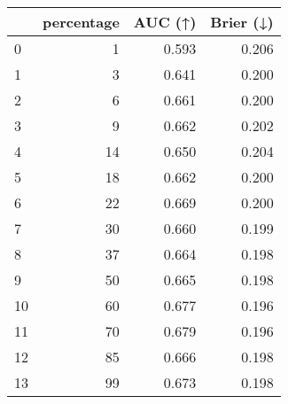 \begin{tabular}{lrrr}
\toprule
 & percentage & AUC (↑) & Brier (↓) \\
\midrule
0 & 1 & 0.593 & 0.206 \\
1 & 3 & 0.641 & 0.200 \\
2 & 6 & 0.661 & 0.200 \\
3 & 9 & 0.662 & 0.202 \\
4 & 14 & 0.650 & 0.204 \\
5 & 18 & 0.662 & 0.200 \\
6 & 22 & 0.669 & 0.200 \\
7 & 30 & 0.660 & 0.199 \\
8 & 37 & 0.664 & 0.198 \\
9 & 50 & 0.665 & 0.198 \\
10 & 60 & 0.677 & 0.196 \\
11 & 70 & 0.679 & 0.196 \\
12 & 85 & 0.666 & 0.198 \\
13 & 99 & 0.673 & 0.198 \\
\bottomrule
\end{tabular}
